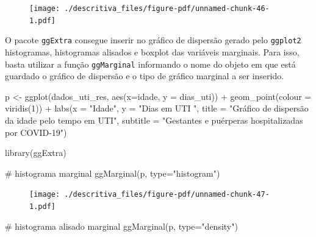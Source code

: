 \documentclass[
  letterpaper,
  DIV=11,
  numbers=noendperiod]{scrreprt}
\newenvironment{Shaded}{\begin{snugshade}}{\end{snugshade}}
\newcommand{\AttributeTok}[1]{\textcolor[rgb]{0.40,0.45,0.13}{#1}}
\newcommand{\CommentTok}[1]{\textcolor[rgb]{0.37,0.37,0.37}{#1}}
\newcommand{\DecValTok}[1]{\textcolor[rgb]{0.68,0.00,0.00}{#1}}
\newcommand{\FunctionTok}[1]{\textcolor[rgb]{0.28,0.35,0.67}{#1}}
\newcommand{\NormalTok}[1]{\textcolor[rgb]{0.00,0.23,0.31}{#1}}
\newcommand{\OtherTok}[1]{\textcolor[rgb]{0.00,0.23,0.31}{#1}}
\newcommand{\SpecialCharTok}[1]{\textcolor[rgb]{0.37,0.37,0.37}{#1}}
\newcommand{\StringTok}[1]{\textcolor[rgb]{0.13,0.47,0.30}{#1}}
\begin{document}
\begin{figure}[H]

{\centering \texttt{[image: ./descritiva\_files/figure-pdf/unnamed-chunk-46-1.pdf]}

}

\end{figure}

O pacote \texttt{ggExtra} consegue inserir no gráfico de dispersão
gerado pelo \texttt{ggplot2} histogramas, histogramas alisados e boxplot
das variáveis marginais. Para isso, basta utilizar a função
\texttt{ggMarginal} informando o nome do objeto em que está guardado o
gráfico de dispersão e o tipo de gráfico marginal a ser inserido.

\begin{Shaded}
\begin{Highlighting}[]
\NormalTok{p }\OtherTok{\textless{}{-}} \FunctionTok{ggplot}\NormalTok{(dados\_uti\_res, }\FunctionTok{aes}\NormalTok{(}\AttributeTok{x=}\NormalTok{idade, }\AttributeTok{y =}\NormalTok{ dias\_uti))  }\SpecialCharTok{+} 
  \FunctionTok{geom\_point}\NormalTok{(}\AttributeTok{colour =} \FunctionTok{viridis}\NormalTok{(}\DecValTok{1}\NormalTok{)) }\SpecialCharTok{+}
  \FunctionTok{labs}\NormalTok{(}\AttributeTok{x =} \StringTok{"Idade"}\NormalTok{, }\AttributeTok{y =} \StringTok{"Dias em UTI "}\NormalTok{, }\AttributeTok{title =} \StringTok{"Gráfico de dispersão da idade pelo tempo em UTI"}\NormalTok{, }\AttributeTok{subtitle =} \StringTok{"Gestantes e puérperas hospitalizadas por COVID{-}19"}\NormalTok{)}

\FunctionTok{library}\NormalTok{(ggExtra)}

\CommentTok{\# histograma marginal}
\FunctionTok{ggMarginal}\NormalTok{(p, }\AttributeTok{type=}\StringTok{"histogram"}\NormalTok{)}
\end{Highlighting}
\end{Shaded}

\begin{figure}[H]

{\centering \texttt{[image: ./descritiva\_files/figure-pdf/unnamed-chunk-47-1.pdf]}

}

\end{figure}

\begin{Shaded}
\begin{Highlighting}[]
\CommentTok{\# histograma alisado marginal}
\FunctionTok{ggMarginal}\NormalTok{(p, }\AttributeTok{type=}\StringTok{"density"}\NormalTok{)}
\end{Highlighting}
\end{Shaded}
\end{document}
